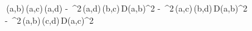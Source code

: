 \lambda\,\delta(a,b)\,\delta(a,c)\,\delta(a,d) - \,\lambda^{2}\,\delta(a,d)\,\delta(b,c)\,D(a,b)^{2} - \,\lambda^{2}\,\delta(a,c)\,\delta(b,d)\,D(a,b)^{2} \\
\qquad - \,\lambda^{2}\,\delta(a,b)\,\delta(c,d)\,D(a,c)^{2}
